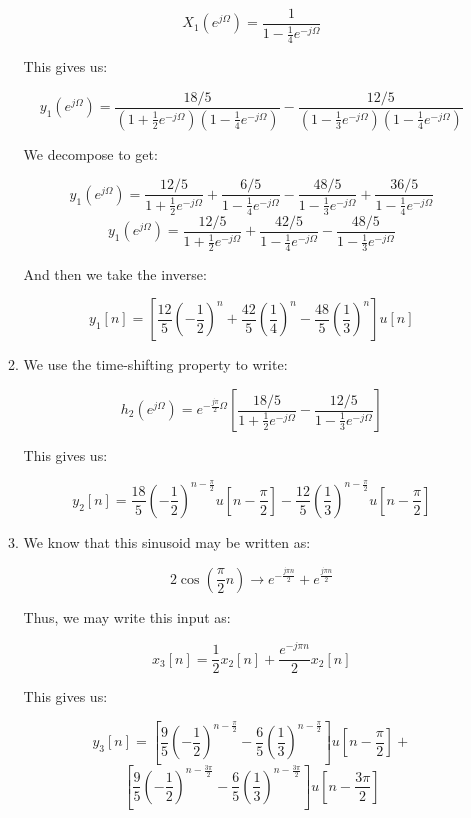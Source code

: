 \begin{enumerate}
\begin{enumerate}
        $$X_1(e^{j\Omega})=\frac{1}{1-\frac{1}{4}e^{-j\Omega}}$$

        This gives us:

        $$y_1(e^{j\Omega})=\frac{18/5}{\left( 1+\frac{1}{2}e^{-j\Omega} \right)\left(1-\frac{1}{4}e^{-j\Omega}\right)}-\frac{12/5}{\left( 1-\frac{1}{3}e^{-j\Omega} \right)\left(1-\frac{1}{4}e^{-j\Omega}\right)}$$

        We decompose to get:

        $$y_1(e^{j\Omega})=\frac{12/5}{1+\frac{1}{2}e^{-j\Omega}}+\frac{6/5}{1-\frac{1}{4}e^{-j\Omega}}-\frac{48/5}{1-\frac{1}{3}e^{-j\Omega}}+\frac{36/5}{1-\frac{1}{4}e^{-j\Omega}}$$
        $$y_1(e^{j\Omega})=\frac{12/5}{1+\frac{1}{2}e^{-j\Omega}}+\frac{42/5}{1-\frac{1}{4}e^{-j\Omega}}-\frac{48/5}{1-\frac{1}{3}e^{-j\Omega}}$$

        And then we take the inverse:

        $$\boxed{y_1[n]=\left[\frac{12}{5}\left( -\frac{1}{2} \right)^n+\frac{42}{5}\left( \frac{1}{4} \right)^n-\frac{48}{5}\left( \frac{1}{3} \right)^n\right]u[n]}$$

      \item We use the time-shifting property to write:

        $$h_2(e^{j\Omega})=e^{-\frac{j \pi}{2}\Omega}\left[\frac{18/5}{1+\frac{1}{2}e^{-j\Omega}}-\frac{12/5}{1-\frac{1}{3}e^{-j\Omega}}\right]$$

        This gives us:

        $$\boxed{y_2[n]=\frac{18}{5}\left( -\frac{1}{2} \right)^{n-\frac{\pi}{2}}u\left[ n-\frac{\pi}{2} \right]-\frac{12}{5}\left( \frac{1}{3} \right)^{n-\frac{\pi}{2}}u\left[ n-\frac{\pi}{2} \right]}$$

      \item We know that this sinusoid may be written as:

        $$2\cos\left( \frac{\pi}{2}n \right)\to e^{-\frac{j\pi n}{2}}+e^{\frac{j\pi n}{2}}$$

        Thus, we may write this input as:

        $$x_3[n]=\frac{1}{2}x_2[n]+\frac{e^{-j\pi n}}{2}x_2[n]$$

        This gives us:

        $$\boxed{y_3[n]=\left[\frac{9}{5}\left( -\frac{1}{2} \right)^{n-\frac{\pi}{2}}-\frac{6}{5}\left( \frac{1}{3} \right)^{n-\frac{\pi}{2}}\right]u\left[ n-\frac{\pi}{2} \right]+}$$
        $$\boxed{\left[\frac{9}{5}\left( -\frac{1}{2} \right)^{n-\frac{3\pi}{2}}-\frac{6}{5}\left( \frac{1}{3} \right)^{n-\frac{3\pi}{2}}\right]u\left[ n-\frac{3\pi}{2} \right]}$$


\end{enumerate}
\end{enumerate}
